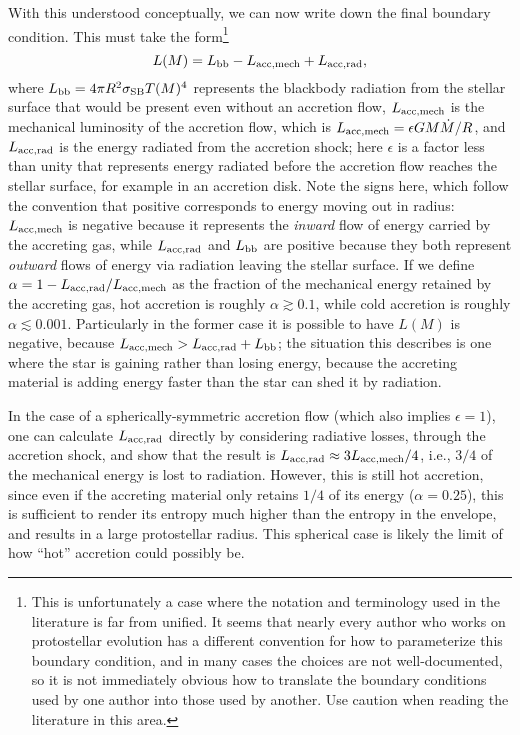 With this understood conceptually, we can now write down the final boundary condition. This must take the form\footnote{This is unfortunately a case where the notation and terminology used in the literature is far from unified. It seems that nearly every author who works on protostellar evolution has a different convention for how to parameterize this boundary condition, and in many cases the choices are not well-documented, so it is not immediately obvious how to translate the boundary conditions used by one author into those used by another. Use caution when reading the literature in this area.}
\begin{equation}
\label{lbound1}
L(M) = L_{\rm bb} - L_{\rm acc,mech} + L_{\rm acc,rad},
\end{equation}
where $L_{\rm bb} = 4\pi R^2 \sigma_{\rm SB} T(M)^4$ represents the blackbody radiation from the stellar surface that would be present even without an accretion flow, $L_{\rm acc,mech}$ is the mechanical luminosity of the accretion flow, which is $L_{\rm acc,mech}=\epsilon G M \dot{M}/R$, and $L_{\rm acc,rad}$ is the energy radiated from the accretion shock; here $\epsilon$ is a factor less than unity that represents energy radiated before the accretion flow reaches the stellar surface, for example in an accretion disk. Note the signs here, which follow the convention that positive corresponds to energy moving out in radius: $L_{\rm acc,mech}$ is negative because it represents the \textit{inward} flow of energy carried by the accreting gas, while $L_{\rm acc,rad}$ and $L_{\rm bb}$ are positive because they both represent \textit{outward} flows of energy via radiation leaving the stellar surface. If we define $\alpha = 1 - L_{\rm acc,rad}/L_{\rm acc,mech}$ as the fraction of the mechanical energy retained by the accreting gas, hot accretion is roughly $\alpha \gtrsim 0.1$, while cold accretion is roughly $\alpha \lesssim 0.001$. Particularly in the former case it is possible to have $L(M)$ is negative, because $L_{\rm acc,mech} > L_{\rm acc,rad} + L_{\rm bb}$; the situation this describes is one where the star is gaining rather than losing energy, because the accreting material is adding energy faster than the star can shed it by radiation.

In the case of a spherically-symmetric accretion flow (which also implies $\epsilon=1$), one can calculate $L_{\rm acc,rad}$ directly by considering radiative losses, through the accretion shock, and \citet{stahler80a, stahler80b, stahler81a} show that the result is $L_{\rm acc,rad}\approx 3 L_{\rm acc,mech}/4$, i.e., $3/4$ of the mechanical energy is lost to radiation. However, this is still hot accretion, since even if the accreting material only retains $1/4$ of its energy ($\alpha=0.25$), this is sufficient to render its entropy much higher than the entropy in the envelope, and results in a large protostellar radius. This spherical case is likely the limit of how ``hot'' accretion could possibly be.

